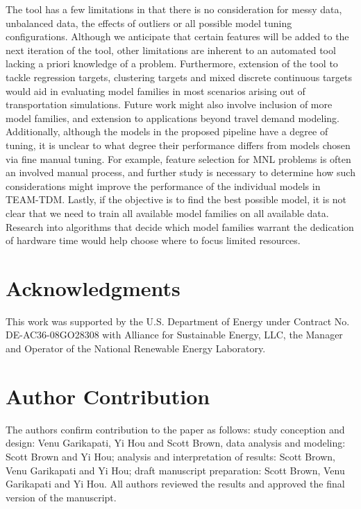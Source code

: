 \documentclass[numbered]{trbunofficial}
\begin{document}
The tool has a few limitations in that there is no consideration for messy data, unbalanced data, the effects of outliers or all possible model tuning configurations. 
 Although we anticipate that certain features will be added to the next iteration of the tool, other limitations are inherent to an automated tool lacking a priori knowledge of a problem. 
 Furthermore, extension of the tool to tackle regression targets, clustering targets and mixed discrete continuous targets would aid in evaluating model families in most scenarios arising out of transportation simulations.
 Future work might also involve inclusion of more model families, and extension to applications beyond travel demand modeling.
 Additionally, although the models in the proposed pipeline have a degree of tuning, it is unclear to what degree their performance differs from models chosen via fine manual tuning.
 For example, feature selection for MNL problems is often an involved manual process, and further study is necessary to determine how such considerations might improve the performance of the individual models in TEAM-TDM.
 Lastly, if the objective is to find the best possible model, it is not clear that we need to train all available model families on all available data.
 Research into algorithms that decide which model families warrant the dedication of hardware time would help choose where to focus limited resources.

\section{Acknowledgments}
This work was supported by the U.S. Department of Energy under Contract No. DE-AC36-08GO28308 with Alliance for Sustainable Energy, LLC, the Manager and Operator of the National Renewable Energy Laboratory.

\section{Author Contribution} \label{section:contributions}

The authors confirm contribution to the paper as follows: study conception and design: Venu Garikapati, Yi Hou and Scott Brown, data analysis and modeling: Scott Brown and Yi Hou; analysis and interpretation of results: Scott Brown, Venu Garikapati and Yi Hou; draft manuscript preparation: Scott Brown, Venu Garikapati and Yi Hou. All authors reviewed the results and approved the final version of the manuscript.



\end{document}
